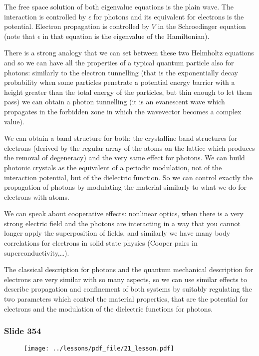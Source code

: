 \documentclass[../main/main.tex]{subfiles}
\begin{document}
The free space solution of both eigenvalue equations is the plain wave. 
The interaction is controlled by $\epsilon$ for photons and its equivalent for electrons is the potential. Electron propagation is controlled by $V$ in the Schroedinger equation (note that $\epsilon$ in that equation is the eigenvalue of the Hamiltonian). 

There is a strong analogy that we can set between these two Helmholtz equations and so we can have all the properties of a typical quantum particle also for photons: similarly to the electron tunnelling (that is the exponentially decay probability when some particles penetrate a potential energy barrier with a height greater than the total energy of the particles, but thin enough to let them pass) we can obtain a photon tunnelling (it is an evanescent wave which propagates in the forbidden zone in which the wavevector becomes a complex value).

We can obtain a band structure for both: the crystalline band structures for electrons (derived by the regular array of the atoms on the lattice which produces the removal of degeneracy) and the very same effect for photons. We can build photonic crystals as the equivalent of a periodic modulation, not of the interaction potential, but of the dielectric function. So we can control exactly the propagation of photons by modulating the material similarly to what we do for electrons with atoms.

We can speak about cooperative effects: nonlinear optics, when there is a very strong electric field and the photons are interacting in a way that you cannot longer apply the superposition of fields, and similarly we have many body correlations for electrons in solid state physics (Cooper pairs in superconductivity,…). 

The classical description for photons and the quantum mechanical description for electrons are very similar with so many aspects, so we can use similar effects to describe propagation and confinement of both systems by suitably regulating the two parameters which control the material properties, that are the potential for electrons and the modulation of the dielectric functions for photons.

\newpage

\subsubsection{Slide 354}

\begin{figure}[h!]
\centering
\texttt{[image: ../lessons/pdf\_file/21\_lesson.pdf]}
\end{figure}
\end{document}

